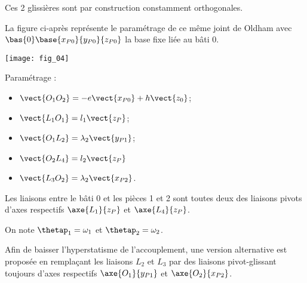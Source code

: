 \begin{multicols}{2}
\begin{multicols}{2}
Ces 2 glissières sont par construction constamment orthogonales.

La figure ci-après représente le paramétrage de ce même joint de Oldham avec $\bas{0}\base{x_{P0}}{y_{P0}}{z_{P0}}$ la base fixe liée au bâti 0.

\begin{center}%
\texttt{[image: fig\_04]}
\end{center}


Paramétrage :
\begin{itemize}
\item $\vect{O_1 O_2} =  - e\vect{x_{P0}} + h \vect{z_0}$;
\item $\vect{L_1 O_1 }=l_1 \vect{z_P}$;
\item $\vect{O_1 L_2 } =\lambda_2 \vect{y_{P1}}$;
\item $\vect{O_2 L_4 } =l_2 \vect{z_P}$
\item $\vect{L_3 O_2} = \lambda_2  \vect{x_{P2}}$.
\end{itemize}

Les liaisons entre le bâti 0 et les pièces 1 et 2 sont toutes deux des liaisons pivots d’axes respectifs
$\axe{L_1}{z_P}$ et $\axe{L_4}{z_P}$.




On note $\thetap_1 = \omega_1$ et $\thetap_2 = \omega_2$.



Afin de baisser l’hyperstatisme de l’accouplement, une version alternative est proposée en 
remplaçant les liaisons $L_2$ et $L_3$ par des liaisons pivot-glissant toujours d’axes respectifs
$\axe{O_1}{y_{P1}}$ et $\axe{O_2}{x_{P2}}$.




\end{multicols}
\end{multicols}
